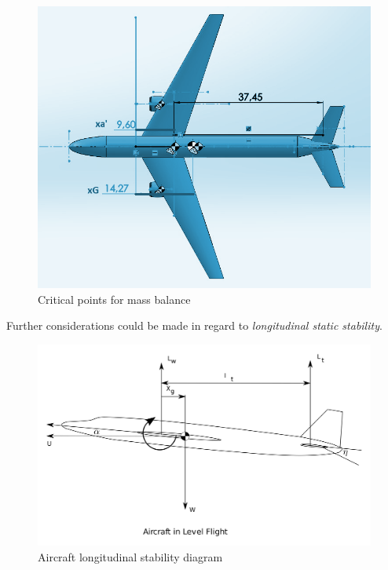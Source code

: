 \documentclass{article}
\begin{document}
\begin{figure}[h!]
    \centering
    \includegraphics[width=\textwidth]{Sources/Plots_and_Pictures/COG.png}
    \caption{Critical points for mass balance}
    \label{COG}
\end{figure}

\clearpage

Further considerations could be made in regard to \textit{longitudinal static stability}.\\ 

\begin{figure}[h!]
    \centering
    \includegraphics[width=\textwidth]{Sources/Plots_and_Pictures/static_stability.png}
    \caption{Aircraft longitudinal stability diagram \autocite{long_stability}}
    \label{static_stability}
\end{figure}
\end{document}
